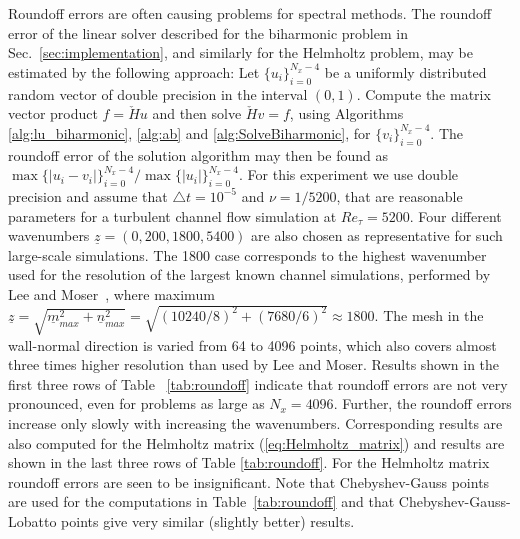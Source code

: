 \documentclass[preprint]{elsarticle}
\newcommand{\N}[1]{\check{#1}}
\begin{document}
Roundoff errors are often causing problems for spectral methods. The roundoff error of the linear solver described for the biharmonic problem in Sec.~\ref{sec:implementation}, and similarly for the Helmholtz problem, may be estimated 
by the following approach: Let $\{u_i\}_{i=0}^{N_x-4}$ be a uniformly distributed 
random vector of double precision in the interval $(0, 1)$. Compute the matrix vector product ${f}=\N{H}{u}$ and 
then solve $\N{H} {v} = {f}$, using Algorithms \ref{alg:lu_biharmonic}, \ref{alg:ab} and \ref{alg:SolveBiharmonic}, for 
$\{v_i\}_{i=0}^{N_x-4}$. The roundoff error of the solution 
algorithm may then be found as $\max \{|u_i-v_i|\}_{i=0}^{N_x-4} / \max \{|u_i|\}_{i=0}^{N_x-4}$. For this experiment we use double precision and assume that $\triangle t= 10^{-5}$ 
and $\nu=1/5200$, that are reasonable parameters for a turbulent channel flow 
simulation at ${Re}_{\tau}=5200$. Four different wavenumbers 
$\underline{z}=(0, 200, 1800, 5400)$ are 
also chosen as representative for such large-scale simulations. The 1800 case corresponds to the highest wavenumber used for the resolution 
of the largest known channel simulations, performed by Lee and 
Moser~\cite{leemoser15}, where maximum $\underline{z} = \sqrt{\underline{m}_{max}^2+\underline{n}_{max}^2} = \sqrt{(10240/8)^2 + (7680/6)^2} \approx 1800$. The mesh in the wall-normal direction 
is varied from 64 to 4096 points, which also covers almost three times higher 
resolution than used by Lee and Moser. Results shown in the 
first three rows of Table ~\ref{tab:roundoff} indicate that 
roundoff errors are not very pronounced, even for problems as large as 
$N_x=4096$. Further, the roundoff errors increase only slowly with increasing 
the wavenumbers. Corresponding results are also computed for the Helmholtz 
matrix (\ref{eq:Helmholtz_matrix}) and 
results are shown in the last three rows of Table \ref{tab:roundoff}. For 
the Helmholtz matrix roundoff errors are seen to be insignificant. Note that Chebyshev-Gauss points are used for the computations in Table~\ref{tab:roundoff} and that Chebyshev-Gauss-Lobatto points give very similar (slightly better) results.
\end{document}
